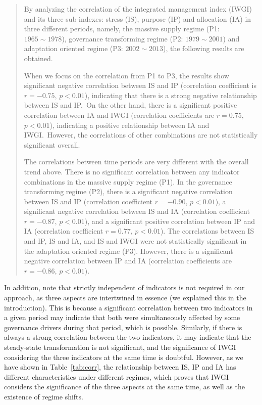 \begin{quote}
	By analyzing the correlation of the integrated management index (IWGI) and its three sub-indexes: stress (IS), purpose (IP) and allocation (IA) in three different periods, namely, the massive supply regime (P1: $1965 \sim 1978$), governance transforming regime (P2: $1979 \sim 2001$) and adaptation oriented regime (P3: $2002 \sim 2013$), the following results are obtained.

	When we focus on the correlation from P1 to P3, the results show significant negative correlation between IS and IP (correlation coefficient is $r = -0.75$, $p < 0.01$), indicating that there is a strong negative relationship between IS and IP.\
	On the other hand, there is a significant positive correlation between IA and IWGI (correlation coefficients are $r = 0.75$, $p < 0.01$), indicating a positive relationship between IA and IWGI.\ However, the correlations of other combinations are not statistically significant overall.

	The correlations between time periods are very different with the overall trend above.
	There is no significant correlation between any indicator combinations in the massive supply regime (P1).
	In the governance transforming regime (P2), there is a significant negative correlation between IS and IP (correlation coefficient $r = -0.90$, $p < 0.01$), a significant negative correlation between IS and IA (correlation coefficient $r = -0.87$, $p < 0.01$), and a significant positive correlation between IP and IA (correlation coefficient $r = 0.77$, $p < 0.01$).
	The correlations between IS and IP, IS and IA, and IS and IWGI were not statistically significant in the adaptation oriented regime (P3). However, there is a significant negative correlation between IP and IA (correlation coefficients are $r = -0.86$, $p < 0.01$).
\end{quote}

\AR*{} In addition, note that strictly independent of indicators is not required in our approach, as three aspects are intertwined in essence (we explained this in the introduction).
This is because a significant correlation between two indicators in a given period may indicate that both were simultaneously affected by some governance drivers during that period, which is possible.
Similarly, if there is always a strong correlation between the two indicators, it may indicate that the steady-state transformation is not significant, and the significance of IWGI considering the three indicators at the same time is doubtful.
However, as we have shown in Table~\ref{tab:corr}, the relationship between IS, IP and IA has different characteristics under different regimes, which proves that IWGI considers the significance of the three aspects at the same time, as well as the existence of regime shifts.

